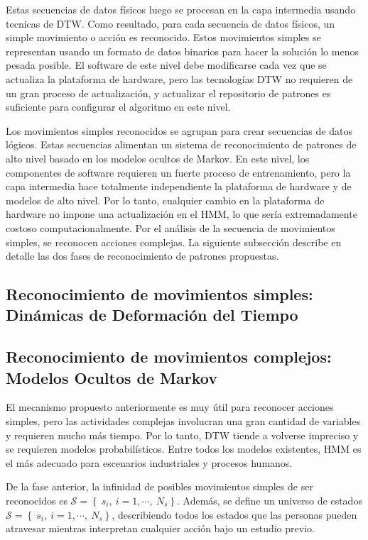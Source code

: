 \documentclass{article}
\begin{document}
Estas secuencias de datos físicos luego se procesan en la capa intermedia usando tecnicas de DTW. Como resultado, para cada secuencia de datos físicos, un simple movimiento o acción es reconocido. Estos movimientos simples se representan usando un formato de datos binarios para hacer la solución lo menos pesada posible. El software de este nivel debe modificarse cada vez que se actualiza la plataforma de hardware, pero las tecnologías DTW no requieren de un gran proceso de actualización, y actualizar el repositorio de patrones es suficiente para configurar el
algoritmo en este nivel.

Los movimientos simples reconocidos se agrupan para crear secuencias de datos lógicos. Estas secuencias alimentan un sistema de reconocimiento de patrones de alto nivel basado en los modelos ocultos de Markov. En este nivel, los componentes de software requieren un fuerte proceso de entrenamiento, pero la capa intermedia hace totalmente independiente la plataforma de hardware y de modelos de alto nivel. Por lo tanto, cualquier cambio en la plataforma de hardware no impone una actualización en el HMM, lo que sería extremadamente costoso computacionalmente. Por el análisis de
la secuencia de movimientos simples, se reconocen acciones complejas.
La siguiente subsección describe en detalle las dos fases de reconocimiento de patrones propuestas.

\subsection{Reconocimiento de movimientos simples: Dinámicas de Deformación del Tiempo}
\subsection{Reconocimiento de movimientos complejos: Modelos Ocultos de Markov}

El mecanismo propuesto anteriormente es muy útil para reconocer acciones simples, pero las actividades complejas involucran una gran cantidad de variables y requieren mucho más tiempo.
Por lo tanto, DTW tiende a volverse impreciso y se requieren modelos probabilísticos. Entre todos los modelos existentes, HMM es el más adecuado para escenarios industriales y procesos humanos.

De la fase anterior, la infinidad de posibles movimientos simples de ser reconocidos es $\mathcal{S} =  \left\lbrace \ s_i,\ i=1,\cdots , \ N_s \right\rbrace$. Además, se define un universo de estados  $\mathcal{S} =  \left\lbrace \ s_i,\ i=1,\cdots , \ N_s \right\rbrace$, describiendo todos los estados que las personas pueden atravesar mientras interpretan cualquier acción bajo un estudio previo.
\end{document}
